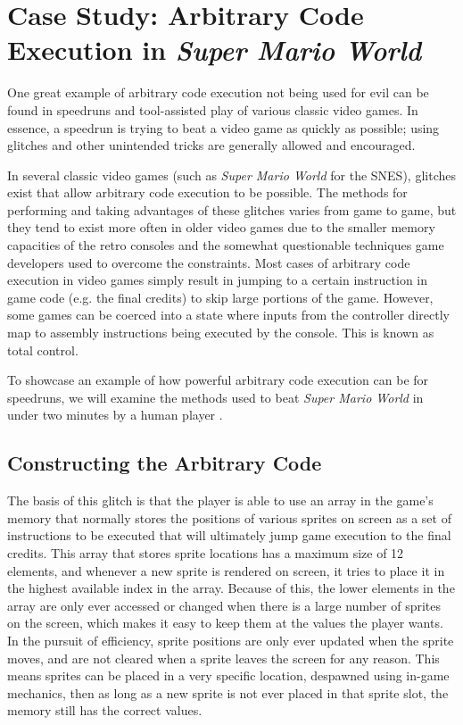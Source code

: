 \section{Case Study: Arbitrary Code Execution in \textit{Super Mario World}}

One great example of arbitrary code execution not being used for evil can be found in speedruns and tool-assisted play of various classic video games. In essence, a speedrun is trying to beat a video game as quickly as possible; using glitches and other unintended tricks are generally allowed and encouraged.

In several classic video games (such as \textit{Super Mario World} for the SNES), glitches exist that allow arbitrary code execution to be possible. The methods for performing and taking advantages of these glitches varies from game to game, but they tend to exist more often in older video games due to the smaller memory capacities of the retro consoles and the somewhat questionable techniques game developers used to overcome the constraints. Most cases of arbitrary code execution in video games simply result in jumping to a certain instruction in game code (e.g. the final credits) to skip large portions of the game. However, some games can be coerced into a state where inputs from the controller directly map to assembly instructions being executed by the console. This is known as total control.

To showcase an example of how powerful arbitrary code execution can be for speedruns, we will examine the methods used to beat \textit{Super Mario World} in under two minutes by a human player \cite{dotsarecool_2015}.

\subsection{Constructing the Arbitrary Code}

The basis of this glitch is that the player is able to use an array in the game’s memory that normally stores the positions of various sprites on screen as a set of instructions to be executed that will ultimately jump game execution to the final credits. This array that stores sprite locations has a maximum size of 12 elements, and whenever a new sprite is rendered on screen, it tries to place it in the highest available index in the array. Because of this, the lower elements in the array are only ever accessed or changed when there is a large number of sprites on the screen, which makes it easy to keep them at the values the player wants. In the pursuit of efficiency, sprite positions are only ever updated when the sprite moves, and are not cleared when a sprite leaves the screen for any reason. This means sprites can be placed in a very specific location, despawned using in-game mechanics, then as long as a new sprite is not ever placed in that sprite slot, the memory still has the correct values.

